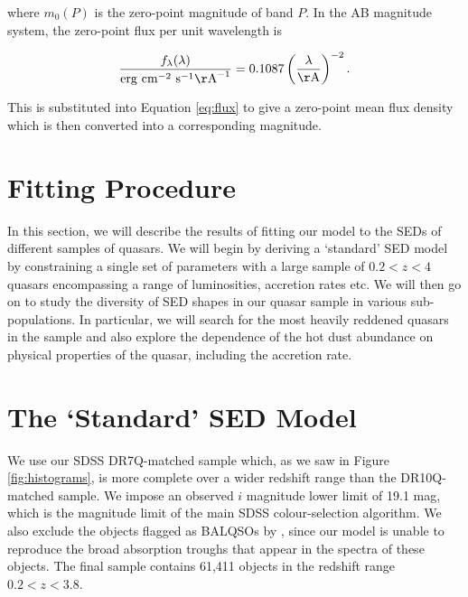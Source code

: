 where $m_0(P)$ is the zero-point magnitude of band $P$. In the AB magnitude system, the zero-point flux per unit wavelength is 

\begin{eqnarray}
  \frac{f_\lambda(\lambda)}{{\rm erg}~{\rm cm}^{-2}~{\rm s}^{-1} {\rm\AA}^{-1}} = 0.1087 \left(\frac{\lambda}{\rm \AA}\right)^{-2} .
\end{eqnarray}

This is substituted into Equation \ref{eq:flux} to give a zero-point mean flux density which is then converted into a corresponding magnitude.  

\section{Fitting Procedure}

In this section, we will describe the results of fitting our model to the SEDs of different samples of quasars. 
We will begin by deriving a `standard' SED model by constraining a single set of parameters with a large sample of $0.2 < z < 4$ quasars encompassing a range of luminosities, accretion rates etc. 
We will then go on to study the diversity of SED shapes in our quasar sample in various sub-populations.  
In particular, we will search for the most heavily reddened quasars in the sample and also explore the dependence of the hot dust abundance on physical properties of the quasar, including the accretion rate. 

\section{The `Standard' SED Model} 

We use our SDSS DR7Q-matched sample which, as we saw in Figure \ref{fig:histograms}, is more complete over a wider redshift range than the DR10Q-matched sample. 
We impose an observed $i$ magnitude lower limit of 19.1 mag, which is the magnitude limit of the main SDSS colour-selection algorithm. 
We also exclude the objects flagged as BALQSOs by \citet{shen11}, since our model is unable to reproduce the broad absorption troughs that appear in the spectra of these objects. 
The final sample contains 61,411 objects in the redshift range $0.2 < z < 3.8$. 

